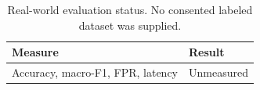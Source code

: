 \begin{table}[t]
\centering
\caption{Real-world evaluation status. No consented labeled dataset was supplied.}
\begin{tabular}{ll}\hline
Measure & Result \\
\hline
Accuracy, macro-F1, FPR, latency & Unmeasured \\
\hline\end{tabular}
\end{table}
